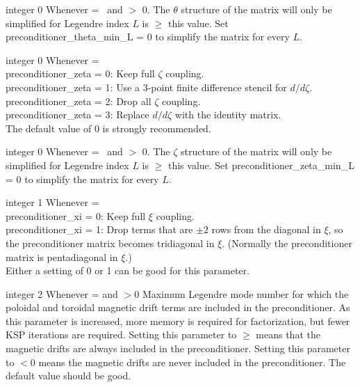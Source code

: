 \myhrule

{integer}
{0}
{Whenever  = \true~and  $>$ 0.}
{The $\theta$ structure of the matrix will only be simplified for Legendre index $L$ is $\ge$ this value.
Set {\ttfamily preconditioner\_theta\_min\_L} = 0 to simplify the matrix for every $L$.
}

\myhrule

{integer}
{0}
{Whenever  = \true}
{\\
{\ttfamily preconditioner\_zeta} = 0: Keep full $\zeta$ coupling.\\

{\ttfamily preconditioner\_zeta} = 1: Use a 3-point finite difference stencil for $d/d\zeta$.\\

{\ttfamily preconditioner\_zeta} = 2: Drop all $\zeta$ coupling.\\

{\ttfamily preconditioner\_zeta} = 3: Replace $d/d\zeta$ with the identity matrix.\\

The default value of 0 is strongly recommended.}

\myhrule

{integer}
{0}
{Whenever  = \true~and  $>$ 0.}
{The $\zeta$ structure of the matrix will only be simplified for Legendre index $L$ is $\ge$ this value.
Set {\ttfamily preconditioner\_zeta\_min\_L} = 0 to simplify the matrix for every $L$.
}

\myhrule

{integer}
{1}
{Whenever  = \true}
{\\
{\ttfamily preconditioner\_xi} = 0: Keep full $\xi$ coupling.\\

{\ttfamily preconditioner\_xi} = 1: Drop terms that are $\pm 2$ rows from the diagonal in $\xi$, 
      so the preconditioner matrix becomes tridiagonal in $\xi$.
(Normally the preconditioner matrix is pentadiagonal in $\xi$.)\\

Either a setting of 0 or 1 can be good for this parameter.}

\myhrule

{integer}
{2}
{Whenever  = \true and $>0$}
{Maximum Legendre mode number for which the poloidal and toroidal magnetic drift terms are included in the preconditioner.
As this parameter is increased, more memory is required for factorization, but fewer KSP iterations are required.
Setting this parameter to $\ge$  means that the magnetic drifts are always included in the preconditioner.
Setting this parameter to $<0$ means the magnetic drifts are never included in the preconditioner.
The default value should be good.}

